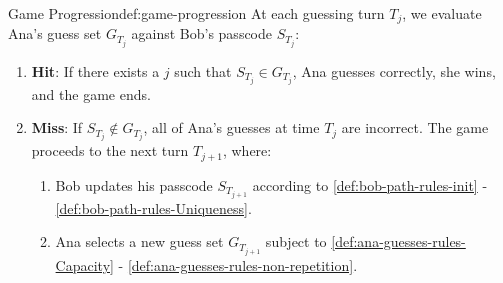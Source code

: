 \begin{definition}{Game Progression}{def:game-progression}
At each guessing turn $T_j$, we evaluate Ana's guess set $G_{T_j}$ against Bob's passcode $S_{T_j}$: 

\begin{enumerate}[label=G\arabic*,ref=G\arabic*]

\item \label{def:game-progression-hit} \textbf{Hit}: If there exists a $j$ such that $S_{T_j} \in G_{T_j}$, Ana guesses correctly, she wins, and the game ends.

\item \label{def:game-progression-hit} \textbf{Miss}: If $S_{T_j} \notin G_{T_j}$, all of Ana's guesses at time $T_j$ are incorrect. The game proceeds to the next turn $T_{j+1}$, where:

\begin{enumerate}[label=(\arabic*)]
    \item Bob updates his passcode $S_{T_{j+1}}$ according to \ref{def:bob-path-rules-init} - \ref{def:bob-path-rules-Uniqueness}.
    \item Ana selects a new guess set $G_{T_{j+1}}$ subject to \ref{def:ana-guesses-rules-Capacity} - \ref{def:ana-guesses-rules-non-repetition}.
\end{enumerate}
\end{enumerate}
\end{definition}



